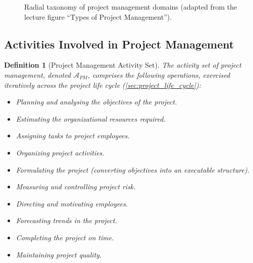 \documentclass[12pt, a4paper]{report}
\theoremstyle{engnotes}
\newtheorem{defn}{Definition}[section]
\begin{document}
\begin{figure}[H]
    \centering
    \caption{Radial taxonomy of project management domains (adapted from the lecture figure ``Types of Project Management'').}
    \label{fig:types_pm}
\end{figure}

\subsection{Activities Involved in Project Management}
\label{subsec:activities_pm}

\begin{defn}[Project Management Activity Set]\label{def:pm_activity_set}
    The activity set of project management, denoted $\mathcal{A}_{PM}$, comprises the following operations, exercised iteratively across the project life cycle (\cref{sec:project_life_cycle}):
    \begin{itemize}
        \item Planning and analysing the objectives of the project.
        \item Estimating the organizational resources required.
        \item Assigning tasks to project employees.
        \item Organizing project activities.
        \item Formulating the project (converting objectives into an executable structure).
        \item Measuring and controlling project risk.
        \item Directing and motivating employees.
        \item Forecasting trends in the project.
        \item Completing the project on time.
        \item Maintaining project quality.
    \end{itemize}
\end{defn}
\end{document}
